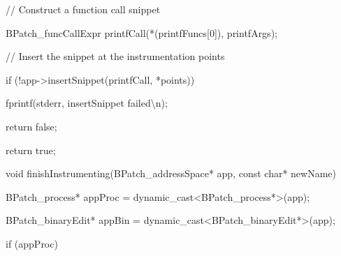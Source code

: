 {{{{\bigskip



{

// Construct a function call snippet



{

BPatch_funcCallExpr printfCall(*(printfFuncs[0]), printfArgs);}





\bigskip



{

// Insert the snippet at the instrumentation points}



{

if (!app->insertSnippet(printfCall, *points)) {}



{

fprintf(stderr, {\textquotedbl}insertSnippet failed{\textbackslash}n{\textquotedbl});}



{

return false;}



{

}}



{

return true;}



{

}}





\bigskip



{

void finishInstrumenting(BPatch_addressSpace* app, const char* newName) {}



{

BPatch_process* appProc = dynamic_cast<BPatch_process*>(app);}



{

BPatch_binaryEdit* appBin = dynamic_cast<BPatch_binaryEdit*>(app);}





\bigskip



{

if (appProc) {}



}}}}}}
